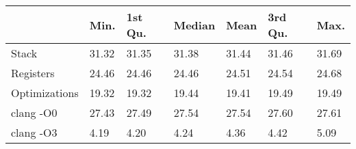 \begin{table}[ht]
\centering
\begin{tabular}{p{}p{}p{}p{}p{}p{}p{}}
  \hline
 & Min. & 1st Qu. & Median & Mean & 3rd Qu. & Max. \\ 
  \hline
Stack & 31.32 & 31.35 & 31.38 & 31.44 & 31.46 & 31.69 \\ 
  Registers & 24.46 & 24.46 & 24.46 & 24.51 & 24.54 & 24.68 \\ 
  Optimizations & 19.32 & 19.32 & 19.44 & 19.41 & 19.49 & 19.49 \\ 
  clang -O0 & 27.43 & 27.49 & 27.54 & 27.54 & 27.60 & 27.61 \\ 
  clang -O3 & 4.19 & 4.20 & 4.24 & 4.36 & 4.42 & 5.09 \\ 
   \hline
\end{tabular}
\end{table}
